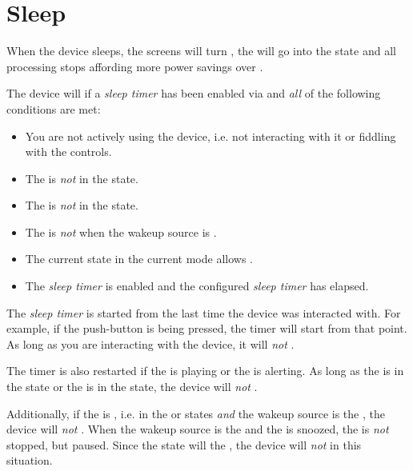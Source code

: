 \section{Sleep} \label{Power - Sleep} 

When the device sleeps, the screens will turn , the  will go into
the  state and all processing stops affording more power savings over
.

\par\medskip

The device will  if a \textit{sleep timer} has been enabled via
\hyperref[Power Settings]{} and \textit{all} of the following conditions
are met:

\begin{itemize}
  \item You are not actively using the device, i.e. not interacting with it or
    fiddling with the controls.
  \item The  is \textit{not} in the  state.
  \item The  is \textit{not} in the  state.
  \item The  is \textit{not}  when the wakeup source is .
  \item The current state in the current mode allows .
  \item The \textit{sleep timer} is enabled and the configured
    \textit{sleep timer} has elapsed.
\end{itemize}

The \textit{sleep timer} is started from the last time the device was interacted
with.  For example, if the  push-button is being pressed, the timer will
start from that point.  As long as you are interacting with the device, it will
\textit{not} .

\par\medskip

The timer is also restarted if the  is playing or the  is
alerting.  As long as the  is in the  state or the  is in
the  state, the device will \textit{not} .

\par\medskip

Additionally, if the  is , i.e. in the  or 
states \textit{and} the wakeup source is the , the device will
\textit{not} .  When the wakeup source is the  and the 
is snoozed, the  is \textit{not} stopped, but paused.  Since the
 state will  the , the device will \textit{not}
 in this situation.

